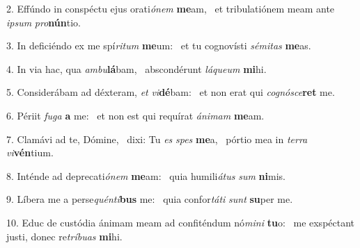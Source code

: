 2. Effúndo in conspéctu ejus orati\textit{ó}\textit{nem} \textbf{me}am, \ast\  et tribulatiónem meam ante \textit{ip}\textit{sum} \textit{pro}\textbf{nún}tio.\

3. In deficiéndo ex me spí\textit{ri}\textit{tum} \textbf{me}um: \ast\  et tu cognovísti \textit{sé}\textit{mi}\textit{tas} \textbf{me}as.\

4. In via hac, qua \textit{am}\textit{bu}\textbf{lá}bam, \ast\  abscondérunt \textit{lá}\textit{que}\textit{um} \textbf{mi}hi.\

5. Considerábam ad déxteram, \textit{et} \textit{vi}\textbf{dé}bam: \ast\  et non erat qui \textit{co}\textit{gnó}\textit{sce}\textbf{ret} me.\

6. Périit \textit{fu}\textit{ga} \textbf{a} me: \ast\  et non est qui requírat \textit{á}\textit{ni}\textit{mam} \textbf{me}am.\

7. Clamávi ad te, Dómine, \dag\  dixi: Tu \textit{es} \textit{spes} \textbf{me}a, \ast\  pórtio mea in \textit{ter}\textit{ra} \textit{vi}\textbf{vén}tium.\

8. Inténde ad deprecati\textit{ó}\textit{nem} \textbf{me}am: \ast\  quia humili\textit{á}\textit{tus} \textit{sum} \textbf{ni}mis.\

9. Líbera me a perse\textit{quén}\textit{ti}\textbf{bus} me: \ast\  quia confor\textit{tá}\textit{ti} \textit{sunt} \textbf{su}per me.\

10. Educ de custódia ánimam meam ad confiténdum nó\textit{mi}\textit{ni} \textbf{tu}o: \ast\  me exspéctant justi, donec re\textit{trí}\textit{bu}\textit{as} \textbf{mi}hi.\

